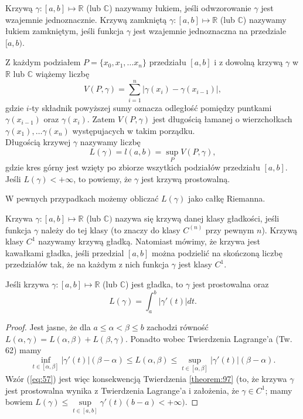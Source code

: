 \documentclass[leqno]{article}
\begin{document}
\begin{justify}
\begin{defn}
Krzywą $\gamma : [a,b] \mapsto \mathbb{R}$ (lub $\mathbb{C}$) nazywamy łukiem, jeśli odwzorowanie $\gamma$ jest wzajemnie
jednoznacznie. Krzywą zamkniętą $\gamma : [a,b] \mapsto \mathbb{R}$ (lub $\mathbb{C}$) nazywamy łukiem zamkniętym, jeśli funkcja $\gamma$ jest wzajemnie jednoznaczna na przedziale $[a,b)$.
\end{defn}

\begin{defn}
    Z każdym podziałem $P = \{x_0, x_1, \ldots x_n\}$ przedziału $[a,b]$ i z dowolną krzywą $\gamma$ w
    $\mathbb{R}$ lub $\mathbb{C}$ wiążemy liczbę
    \[
        V(P, \gamma) = \sum_{i=1}^{n}|\gamma(x_i)-\gamma(x_{i-1})|,
    \]
    gdzie $i$-ty składnik powyższej sumy oznacza odległość pomiędzy puntkami $\gamma(x_{i-1})$ oraz
    $\gamma(x_{i})$. Zatem $V(P, \gamma)$ jest długością łamanej o wierzchołkach $\gamma(x_1), \ldots \gamma(x_n)$ występujacych w takim porządku. \\
    Długością krzywej $\gamma$ nazywamy liczbę
    \[
        L(\gamma) = l(a,b) = \sup_P V(P, \gamma),
    \]
    gdzie kres górny jest wzięty po zbiorze wszytkich podziałów przedziału $[a,b]$.
    Jeśli $L(\gamma) < +\infty$, to powiemy, że $\gamma$ jest krzywą prostowalną. 
\end{defn}

W pewnych przypadkach możemy obliczać $L(\gamma)$ jako całkę Riemanna.

\begin{defn}
Krzywa $\gamma : [a,b] \mapsto \mathbb{R}$ (lub $\mathbb{C})$ nazywa się krzywą danej klasy gładkości,
jeśli funkcja $\gamma$ należy do tej klasy (to znaczy do klasy $C^{(n)}$ przy pewnym $n$).
Krzywą klasy $C^1$ nazywamy krzywą gładką. Natomiast mówimy, że krzywa jest kawałkami gładka, jeśli przedzial $[a,b]$ można 
podzielić na skończoną liczbę przedziałów tak, że na każdym z nich funkcja $\gamma$ jest klasy $C^1$.
\end{defn}

\begin{theorem}
{
    Jeśli krzywa $\gamma : [a,b] \mapsto \mathbb{R}$ (lub $\mathbb{C}$) jest gładka, to $\gamma$ jest prostowalna oraz
    \begin{equation}\label{eq:57}
        L(\gamma) = \int_{a}^{b}|\gamma'(t)|dt.
    \end{equation}
}
\end{theorem}

\begin{proof}
    Jest jasne, że dla $a \leqslant \alpha < \beta \leqslant b$ zachodzi równość $L(\alpha, \gamma) = L(\alpha, \beta) + L(\beta, \gamma)$.
    Ponadto wobec Twierdzenia Lagrange'a (Tw. 62) mamy
    \[
        \inf_{t \in [\alpha, \beta]} |\gamma'(t)|(\beta - \alpha) \leqslant L(\alpha, \beta) \leqslant \sup_{t \in [\alpha, \beta]} |\gamma'(t)|(\beta - \alpha).
    \]
    Wzór (\ref{eq:57}) jest więc konsekwencją Twierdzenia \ref{theorem:97} (to, że krzywa $\gamma$ jest prostowalna wynika z Twierdzenia Lagrange'a i założenia, że
    $\gamma \in C^1$; mamy bowiem $L(\gamma) \leqslant \sup\limits_{t \in [a,b]} \gamma'(t)(b-a) < +\infty)$.
\end{proof}


\end{justify}
\end{document}
